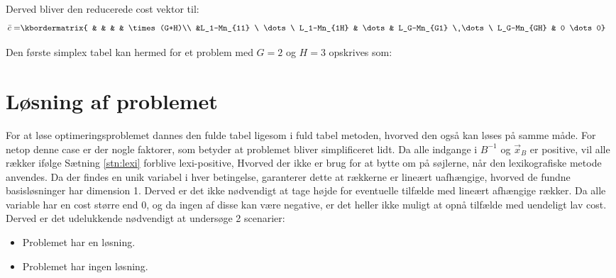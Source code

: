 Derved bliver den reducerede cost vektor til:
\begin{align*}
\bar{c}=	& \kbordermatrix{
& & & & \times (G+H)\\
&L_1-Mn_{11} \ \dots \ L_1-Mn_{1H} & \dots & L_G-Mn_{G1} \ \dots \  L_G-Mn_{GH} & 0 \dots 0}
\end{align*}

Den første simplex tabel kan hermed for et problem med $G=2$ og $H=3$ opskrives som:\\



\section{Løsning af problemet}
For at løse optimeringsproblemet dannes den fulde tabel ligesom i fuld tabel metoden, hvorved den også kan løses på samme måde.
For netop denne case er der nogle faktorer, som betyder at problemet bliver simplificeret lidt.
Da alle indgange i $B^{-1}$ og $\vec{x}_B$ er positive, vil alle rækker ifølge Sætning \ref{stn:lexi} forblive lexi-positive, Hvorved der ikke er brug for at bytte om på søjlerne, når den lexikografiske metode anvendes.
Da der findes en unik variabel i hver betingelse, garanterer dette at rækkerne er lineært uafhængige, hvorved de fundne basisløsninger har dimension 1. Derved er det ikke nødvendigt at tage højde for eventuelle tilfælde med lineært afhængige rækker. Da alle variable har en cost større end 0, og da ingen af disse kan være negative, er det heller ikke muligt at opnå tilfælde med uendeligt lav cost. Derved er det udelukkende nødvendigt at undersøge 2 scenarier: 
\begin{itemize}
\item Problemet har en løsning.
\item Problemet har ingen løsning.
\end{itemize}


